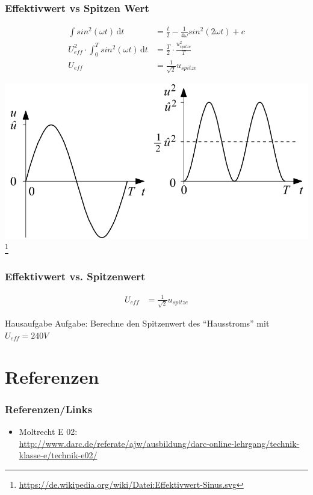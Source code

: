 \begin{frame}
    \frametitle{Effektivwert vs Spitzen Wert}
    \begin{align} 
		\int \! sin^2(\omega t) \, \mathrm{d}t & = \frac{t}{2} - \frac{1}{4\omega}sin^2(2\omega t) + c \\
		U_{eff}^2 \cdot \int_0^T \! sin^2(\omega t) \, \mathrm{d}t & = \frac{T}{2} \cdot \frac{u_{spitze}^2}{T} \\
		U_{eff} & = \frac{1}{\sqrt{2}} u_{spitze}
	\end{align}
	    \begin{center}
	    \includegraphics[width=.6\textwidth]{e02/EffektivwertSinus.png}\\
	    \footnote{\tiny \url{https://de.wikipedia.org/wiki/Datei:Effektivwert-Sinus.svg}}
	    \end{center}
\end{frame}

\begin{frame}
    \frametitle{Effektivwert vs. Spitzenwert}
    \begin{align} 
		U_{eff} & = \frac{1}{\sqrt{2}} u_{spitze}
	\end{align}
	\begin{alertblock}{Hausaufgabe}
	    Aufgabe: Berechne den Spitzenwert des ``Hausstroms'' mit $U_{eff} = 240V$
	\end{alertblock}
\end{frame}

\section*{Referenzen}

\begin{frame}
    \frametitle{Referenzen/Links}
    
    \footnotesize
    \begin{itemize}
        \item Moltrecht E 02: \\
              \url{http://www.darc.de/referate/ajw/ausbildung/darc-online-lehrgang/technik-klasse-e/technik-e02/}
    \end{itemize}

\end{frame}


